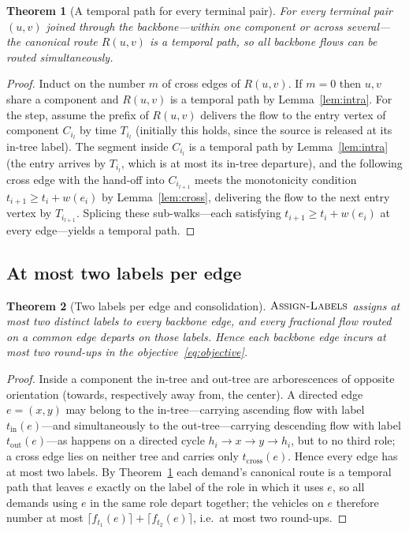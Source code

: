 \documentclass[11pt]{article}
\newtheorem{theorem}{Theorem}
\theoremstyle{definition}
\theoremstyle{remark}
\begin{document}
\begin{theorem}[A temporal path for every terminal pair]\label{thm:temporal}
For every terminal pair $(u,v)$ joined through the backbone---within one component or across
several---the canonical route $R(u,v)$ is a temporal path, so all backbone flows can be routed
simultaneously.
\end{theorem}

\begin{proof}
Induct on the number $m$ of cross edges of $R(u,v)$. If $m=0$ then $u,v$ share a component and $R(u,v)$
is a temporal path by Lemma~\ref{lem:intra}. For the step, assume the prefix of $R(u,v)$ delivers the
flow to the entry vertex of component $C_{i_l}$ by time $T_{i_l}$ (initially this holds, since the
source is released at its in-tree label). The segment inside $C_{i_l}$ is a temporal path by
Lemma~\ref{lem:intra} (the entry arrives by $T_{i_l}$, which is at most its in-tree departure), and
the following cross edge with the hand-off into $C_{i_{l+1}}$ meets the monotonicity condition
$t_{i+1}\ge t_i+w(e_i)$ by Lemma~\ref{lem:cross}, delivering the flow to the next entry vertex by
$T_{i_{l+1}}$. Splicing these sub-walks---each satisfying $t_{i+1}\ge t_i+w(e_i)$ at every edge---yields
a temporal path.
\end{proof}

\subsection{At most two labels per edge}\label{sec:twolabel}

\begin{theorem}[Two labels per edge and consolidation]\label{thm:twolabels}
$\textsc{Assign-Labels}$ assigns at most two distinct labels to every backbone edge, and every
fractional flow routed on a common edge departs on those labels. Hence each backbone edge incurs at
most two round-ups in the objective~\eqref{eq:objective}.
\end{theorem}

\begin{proof}
Inside a component the in-tree and out-tree are arborescences of opposite orientation (towards,
respectively away from, the center). A directed edge $e=(x,y)$ may belong to the in-tree---carrying
ascending flow with label $t_{\mathrm{in}}(e)$---and simultaneously to the out-tree---carrying
descending flow with label $t_{\mathrm{out}}(e)$---as happens on a directed cycle $h_i\to x\to y\to h_i$,
but to no third role; a cross edge lies on neither tree and carries only $t_{\mathrm{cross}}(e)$. Hence
every edge has at most two labels. By Theorem~\ref{thm:temporal} each demand's canonical route is a
temporal path that leaves $e$ exactly on the label of the role in which it uses $e$, so all demands
using $e$ in the same role depart together; the vehicles on $e$ therefore number at most
$\lceil f_{t_1}(e)\rceil+\lceil f_{t_2}(e)\rceil$, i.e.\ at most two round-ups.
\end{proof}
\end{document}
